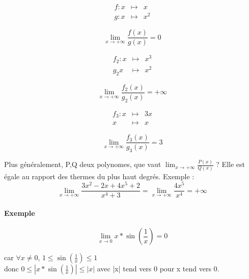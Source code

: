 \begin{align*}
	f:x & \mapsto & x \\
	g:x &\mapsto & x^2
\end{align*}

\[\lim_{x \to +\infty} \frac{f(x)}{g(x)} = 0\]

\begin{align*}
	f_2:x &\mapsto & x^3 \\
	g_2x&\mapsto& x^2
\end{align*}

\[\lim_{x \to +\infty} \frac{f_2(x)}{g_2(x)} = +\infty\]

\begin{align*}
	f_3:x &\mapsto & 3x \\
	x&\mapsto& x
\end{align*}

\[\lim_{x \to +\infty} \frac{f_3(x)}{g_3(x)} = 3\]

Plus généralement, P,Q deux polynomes, que vaut $\lim_{x\to +\infty} \frac{P(x)}{Q(x)}$ ? Elle est égale au rapport des thermes du plus haut degrés.
Exemple : \[\lim_{x \to +\infty} \frac{3x^2 -2x + 4x^5 +2}{x^4+3} = \lim_{x \to +\infty} \frac{4x^5}{x^4} = +\infty\]

\paragraph{Exemple}
\[\lim_{x \to 0} x*\sin(\frac{1}{x}) = 0\]

car $\forall x \neq 0$, $1 \leq \sin(\frac{1}{x}) \leq 1$
~\\
donc $ 0 \leq |x*\sin(\frac{1}{x})| \leq |x|$ avec |x| tend vers 0 pour x tend vers 0.
